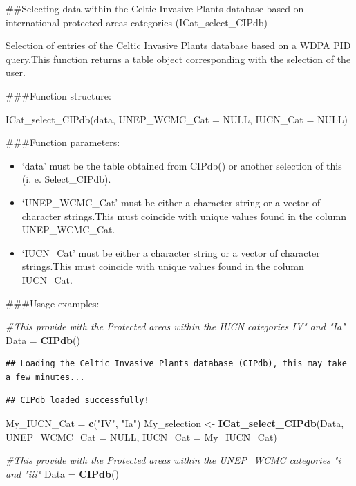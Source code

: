 \documentclass[
]{article}
\newenvironment{Shaded}{\begin{snugshade}}{\end{snugshade}}
\newcommand{\AttributeTok}[1]{\textcolor[rgb]{0.13,0.29,0.53}{#1}}
\newcommand{\CommentTok}[1]{\textcolor[rgb]{0.56,0.35,0.01}{\textit{#1}}}
\newcommand{\ConstantTok}[1]{\textcolor[rgb]{0.56,0.35,0.01}{#1}}
\newcommand{\FunctionTok}[1]{\textcolor[rgb]{0.13,0.29,0.53}{\textbf{#1}}}
\newcommand{\NormalTok}[1]{#1}
\newcommand{\OtherTok}[1]{\textcolor[rgb]{0.56,0.35,0.01}{#1}}
\newcommand{\StringTok}[1]{\textcolor[rgb]{0.31,0.60,0.02}{#1}}
\providecommand{\tightlist}{%
  \setlength{\itemsep}{0pt}\setlength{\parskip}{0pt}}
\begin{document}
\#\#Selecting data within the Celtic Invasive Plants database based on
international protected areas categories (ICat\_select\_CIPdb)

Selection of entries of the Celtic Invasive Plants database based on a
WDPA PID query.This function returns a table object corresponding with
the selection of the user.

\#\#\#Function structure:

ICat\_select\_CIPdb(data, UNEP\_WCMC\_Cat = NULL, IUCN\_Cat = NULL)

\#\#\#Function parameters:

\begin{itemize}
\tightlist
\item
  `data' must be the table obtained from CIPdb() or another selection of
  this (i. e. Select\_CIPdb).
\item
  `UNEP\_WCMC\_Cat' must be either a character string or a vector of
  character strings.This must coincide with unique values found in the
  column UNEP\_WCMC\_Cat.
\item
  `IUCN\_Cat' must be either a character string or a vector of character
  strings.This must coincide with unique values found in the column
  IUCN\_Cat.
\end{itemize}

\#\#\#Usage examples:

\begin{Shaded}
\begin{Highlighting}[]
\CommentTok{\#This provide with the Protected areas within the IUCN categories IV" and "Ia"}
\NormalTok{Data }\OtherTok{=} \FunctionTok{CIPdb}\NormalTok{()}
\end{Highlighting}
\end{Shaded}

\begin{verbatim}
## Loading the Celtic Invasive Plants database (CIPdb), this may take a few minutes...
\end{verbatim}

\begin{verbatim}
## CIPdb loaded successfully!
\end{verbatim}

\begin{Shaded}
\begin{Highlighting}[]
\NormalTok{My\_IUCN\_Cat }\OtherTok{=} \FunctionTok{c}\NormalTok{(}\StringTok{"IV"}\NormalTok{, }\StringTok{"Ia"}\NormalTok{)}
\NormalTok{My\_selection }\OtherTok{\textless{}{-}} \FunctionTok{ICat\_select\_CIPdb}\NormalTok{(Data, }\AttributeTok{UNEP\_WCMC\_Cat =} \ConstantTok{NULL}\NormalTok{, }\AttributeTok{IUCN\_Cat =}\NormalTok{ My\_IUCN\_Cat)}

\CommentTok{\#This provide with the Protected areas within the UNEP\_WCMC categories "i and "iii"}
\NormalTok{Data }\OtherTok{=} \FunctionTok{CIPdb}\NormalTok{()}
\end{Highlighting}
\end{Shaded}
\end{document}
